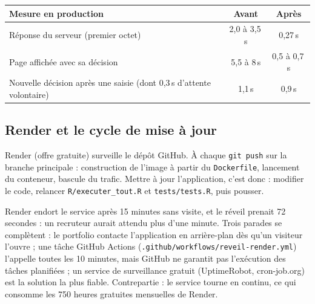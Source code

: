 \documentclass[11pt,a4paper]{article}
\newcommand{\code}[1]{\texttt{#1}}
\begin{document}
\begin{center}\small
\begin{tabular}{@{}lcc@{}}
\toprule
\textbf{Mesure en production} & \textbf{Avant} & \textbf{Après} \\
\midrule
Réponse du serveur (premier octet) & 2,0 à 3,5\,s & 0,27\,s \\
Page affichée avec sa décision & 5,5 à 8\,s & 0,5 à 0,7\,s \\
Nouvelle décision après une saisie (dont 0,3\,s d'attente volontaire) & 1,1\,s & 0,9\,s \\
\bottomrule
\end{tabular}
\end{center}

\subsection{Render et le cycle de mise à jour}
Render (offre gratuite) surveille le dépôt GitHub. À chaque \code{git push} sur la branche principale : construction de l'image à partir du \code{Dockerfile}, lancement du conteneur, bascule du trafic. Mettre à jour l'application, c'est donc : modifier le code, relancer \code{R/executer\_tout.R} et \code{tests/tests.R}, puis pousser.

\begin{alerte}
Render endort le service après 15 minutes sans visite, et le réveil prenait 72 secondes : un recruteur aurait attendu plus d'une minute. Trois parades se complètent : le portfolio contacte l'application en arrière-plan dès qu'un visiteur l'ouvre ; une tâche GitHub Actions (\code{.github/workflows/reveil-render.yml}) l'appelle toutes les 10 minutes, mais GitHub ne garantit pas l'exécution des tâches planifiées ; un service de surveillance gratuit (UptimeRobot, cron-job.org) est la solution la plus fiable. Contrepartie : le service tourne en continu, ce qui consomme les 750 heures gratuites mensuelles de Render.
\end{alerte}

\end{document}
